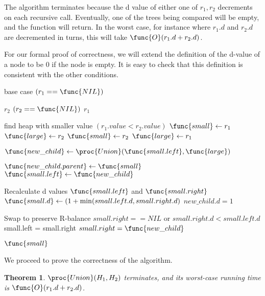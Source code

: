 \documentclass[11pt, answers]{exam}
\theoremstyle{plain}
\newtheorem{theorem}{Theorem}
\theoremstyle{definition}
\begin{document}
\begin{questions}
\begin{parts}
\begin{solution}
\begin{enumerate}
\end{enumerate}
The algorithm terminates because the d value of either one of $r_1, r_2$ decrements on each recursive call. Eventually, one of the trees being compared will be empty, and the function will return. In the worst case, for instance where $r_1.d$ and $r_2.d$ are decremented in turns, this will take $\func{O}(r_1 .d + r_2 .d)$.

For our formal proof of correctness, we will extend the definition of the d-value of a node to be 0 if the node is empty. It is easy to check that this definition is consistent with the other conditions.

\begin{codebox}

\li \Comment  base case
\li \If $(r_1 == \func{NIL})$ \Then		

\li 	\Return $r_2$
\li \ElseIf $(r_2 == \func{NIL})$ \Then
\li 	\Return $r_1$
\li \Else

\li \Comment  find heap with smaller value
\li	\If $(r_1.value	< r_2.value)$ \Then
\li		$\func{small} \gets r_1 $
\li		$\func{large} \gets r_2$
\li	\Else
\li		$\func{small} \gets r_2 $
\li		$\func{large} \gets r_1$
		\End
		
		
\li	$\func{new\_child} \gets \proc{Union}(\func{small.left}, \func{large})$


\li $\func{new\_child.parent} \gets \func{small}$
\li $\func{small.left} \gets \func{new\_child}$

\li \Comment Recalculate d values
\li \If $\func{small.left}$ and $\func{small.right}$ \Then
\li $\func{small.d} \gets (1+\min(small.left.d, small.right.d)$
\li \Else 
\li     ${new\_child.d = 1}$
        \End

\li \Comment Swap to preserve R-balance
\li \If $small.right == NIL$ or $small.right.d < small.left.d$   \Then
\li     small.left = small.right
\li     $small.right = \func{new\_child}$
        \End

\li 	\Return $\func{small}$
	\End
\end{codebox}

We proceed to prove the correctness of the algorithm. 

\begin{theorem}
$\proc{Union}(H_1, H_2)$ terminates, and its worst-case running time is $\func{O}(r_1 .d + r_2 .d)$.
\end{theorem}


\end{solution}
\end{parts}
\end{questions}
\end{document}
